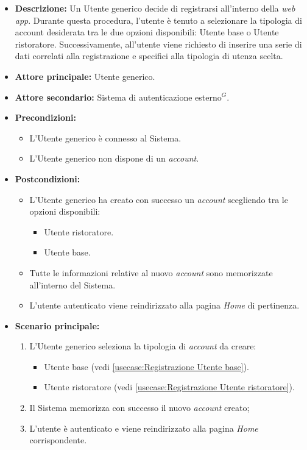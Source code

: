 \label{usecase:Effettua registrazione}

\begin{itemize}
	\item \textbf{Descrizione:} Un Utente generico decide di registrarsi all'interno della \textit{web app}. 
    Durante questa procedura, l'utente è tenuto a selezionare la tipologia di account desiderata tra le due opzioni disponibili: Utente base o Utente ristoratore. 
    Successivamente, all'utente viene richiesto di inserire una serie di dati correlati alla registrazione e specifici alla tipologia di utenza scelta.

	\item \textbf{Attore principale:} Utente generico.
	\item \textbf{Attore secondario:} Sistema di autenticazione esterno$^G$.
	\item \textbf{Precondizioni:}
        \begin{itemize}
            \item L'Utente generico è connesso al Sistema.
            \item L'Utente generico non dispone di un \textit{account}.
        \end{itemize}
	\item \textbf{Postcondizioni:}
        \begin{itemize} 
            \item L'Utente generico ha creato con successo un \textit{account} scegliendo tra le opzioni disponibili:
            \begin{itemize}
                \item Utente ristoratore.
                \item Utente base.
            \end{itemize}
            \item Tutte le informazioni relative al nuovo \textit{account} sono memorizzate all'interno del Sistema.
            \item L'utente autenticato viene reindirizzato alla pagina \textit{Home} di pertinenza.
        \end{itemize}


	\item \textbf{Scenario principale:}
	      \begin{enumerate}
		      \item L'Utente generico seleziona la tipologia di \textit{account} da creare: 
		      \begin{itemize}
				\item Utente base (vedi \autoref{usecase:Registrazione Utente base}).
				\item Utente ristoratore (vedi \autoref{usecase:Registrazione Utente ristoratore}).
			  \end{itemize} 
              \item Il Sistema memorizza con successo il nuovo \textit{account} creato;
		      \item L'utente è autenticato e viene reindirizzato alla pagina \textit{Home} corrispondente.
	      \end{enumerate}
		

\end{itemize}

